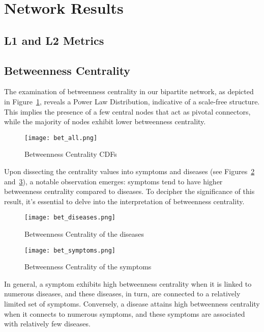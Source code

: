 \section{Network Results}
\subsection{L1 and L2 Metrics}


\subsection{Betweenness Centrality}
The examination of betweenness centrality in our bipartite network, as depicted in Figure~\ref{fig:bet_all}, 
reveals a Power Law Distribution, indicative of a scale-free structure. This implies the presence of a few central 
nodes that act as pivotal connectors, while the majority of nodes exhibit lower betweenness centrality.

\begin{figure}[H]
    \centering
    \texttt{[image: bet\_all.png]}
    \caption{Betweenness Centrality CDFs}
    \label{fig:bet_all}
 \end{figure}

Upon dissecting the centrality values into symptoms and diseases (see Figures~\ref{fig:bet_diseases} and~\ref{fig:bet_symptoms}), 
a notable observation emerges: symptoms tend to have higher betweenness centrality compared to diseases. To decipher the 
significance of this result, it's essential to delve into the interpretation of betweenness centrality.

\begin{figure}[H]
    \centering
    \texttt{[image: bet\_diseases.png]}
    \caption{Betweenness Centrality of the diseases}
    \label{fig:bet_diseases}
\end{figure}

\begin{figure}[H]
    \centering
    \texttt{[image: bet\_symptoms.png]}
    \caption{Betweenness Centrality of the symptoms}
    \label{fig:bet_symptoms}
\end{figure}

In general, a symptom exhibits high betweenness centrality when it is linked to numerous diseases, and these diseases, 
in turn, are connected to a relatively limited set of symptoms. Conversely, a disease attains high betweenness centrality 
when it connects to numerous symptoms, and these symptoms are associated with relatively few diseases.

